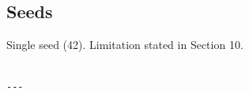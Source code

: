 \subsection{Seeds}

Single seed (42). Limitation stated in Section 10.
\begin{lstlisting}

---
\end{lstlisting}